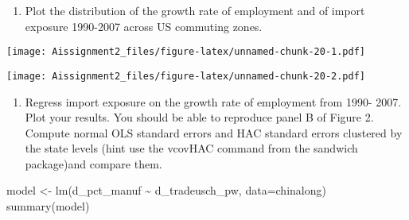 \documentclass[
]{article}
\newenvironment{Shaded}{\begin{snugshade}}{\end{snugshade}}
\newcommand{\AttributeTok}[1]{\textcolor[rgb]{0.77,0.63,0.00}{#1}}
\newcommand{\FunctionTok}[1]{\textcolor[rgb]{0.00,0.00,0.00}{#1}}
\newcommand{\NormalTok}[1]{#1}
\newcommand{\OtherTok}[1]{\textcolor[rgb]{0.56,0.35,0.01}{#1}}
\newcommand{\SpecialCharTok}[1]{\textcolor[rgb]{0.00,0.00,0.00}{#1}}
\newcommand{\StringTok}[1]{\textcolor[rgb]{0.31,0.60,0.02}{#1}}
\providecommand{\tightlist}{%
  \setlength{\itemsep}{0pt}\setlength{\parskip}{0pt}}
\begin{document}
\begin{enumerate}
\def\labelenumi{\alph{enumi})}
\tightlist
\item
  Plot the distribution of the growth rate of employment and of import
  exposure 1990-2007 across US commuting zones.
\end{enumerate}

\begin{Shaded}
\end{Shaded}

\texttt{[image: Aissignment2\_files/figure-latex/unnamed-chunk-20-1.pdf]}

\begin{Shaded}
\end{Shaded}

\texttt{[image: Aissignment2\_files/figure-latex/unnamed-chunk-20-2.pdf]}

\begin{enumerate}
\def\labelenumi{\alph{enumi})}
\setcounter{enumi}{1}
\tightlist
\item
  Regress import exposure on the growth rate of employment from 1990-
  2007. Plot your results. You should be able to reproduce panel B of
  Figure 2. Compute normal OLS standard errors and HAC standard errors
  clustered by the state levels (hint use the vcovHAC command from the
  sandwich package)and compare them.
\end{enumerate}

\begin{Shaded}
\begin{Highlighting}[]
\NormalTok{model }\OtherTok{\textless{}{-}} \FunctionTok{lm}\NormalTok{(d\_pct\_manuf  }\SpecialCharTok{\textasciitilde{}}\NormalTok{ d\_tradeusch\_pw, }\AttributeTok{data=}\NormalTok{chinalong)}
\FunctionTok{summary}\NormalTok{(model)}
\end{Highlighting}
\end{Shaded}
\end{document}
